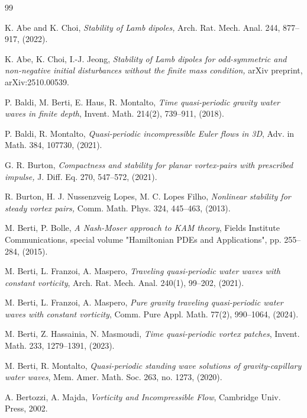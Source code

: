 \documentclass[a4paper,reqno,10pt]{article}
\begin{document}
\begin{thebibliography}{99}
	
    K. Abe and K. Choi, 
    \textit{Stability of Lamb dipoles,}
    Arch. Rat. Mech. Anal. 244, 877--917, (2022).
    
    K. Abe, K. Choi, I.-J. Jeong, 
    {\it Stability of Lamb dipoles for odd-symmetric and non-negative initial disturbances without the finite mass condition,}
    arXiv preprint,  arXiv:2510.00539. 
    
    P. Baldi, M. Berti, E.  Haus, R. Montalto, 
	{\it Time quasi-periodic gravity water waves in finite depth}, Invent. Math. 214(2), 739--911, (2018).

	
	P. Baldi, R.  Montalto,
	{\it Quasi-periodic incompressible Euler flows in 3D},
	Adv. in Math. 384, 107730, (2021).
	

    
    G. R. Burton, 
    \textit{Compactness and stability for planar vortex-pairs with prescribed impulse,}
    J. Diff. Eq. 270, 547--572, (2021).

R. Burton, H. J. Nussenzveig Lopes, M. C. Lopes Filho, 
\textit{Nonlinear stability for steady vortex pairs,}
Comm. Math. Phys. 324, 445--463, (2013).

M. Berti, P. Bolle, 
\textit{A Nash-Moser approach to KAM theory}, 
Fields Institute Communications,
special volume "Hamiltonian PDEs and Applications", pp. 255--284, (2015).

	M. Berti, L. Franzoi, A.  Maspero,
	{\it Traveling quasi-periodic water waves with constant vorticity}, Arch. Rat. Mech. Anal. 240(1), 99--202, (2021). 
	
	M. Berti, L. Franzoi, A.  Maspero,
	{\it Pure gravity traveling quasi-periodic water waves with constant vorticity},  
	Comm. Pure Appl. Math. 77(2), 990--1064, (2024).
	
    M. Berti, Z. Hassainia, N. Masmoudi, 
    \textit{Time quasi-periodic vortex patches}, 
    Invent. Math. 233, 1279--1391, (2023).
	
	M. Berti, R. Montalto,  
	{\it Quasi-periodic standing wave solutions of gravity-capillary water waves}, Mem. Amer. Math. Soc. 263, no. 1273, (2020).
	
     A. Bertozzi, A. Majda, 
     {\it Vorticity and Incompressible Flow}, 
     Cambridge Univ. Press, 2002.


\end{thebibliography}
\end{document}
